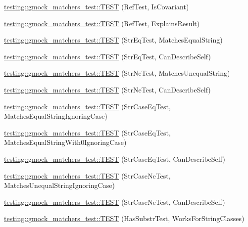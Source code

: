 \begin{DoxyCompactItemize}
\hyperlink{namespacetesting_1_1gmock__matchers__test_a03b45cf0f65f33208ac378b8603ff67a}{testing\+::gmock\+\_\+matchers\+\_\+test\+::\+T\+E\+ST} (Ref\+Test, Is\+Covariant)
\item 
\hyperlink{namespacetesting_1_1gmock__matchers__test_ab73595bcf8dd511b519b640248136ccd}{testing\+::gmock\+\_\+matchers\+\_\+test\+::\+T\+E\+ST} (Ref\+Test, Explains\+Result)
\item 
\hyperlink{namespacetesting_1_1gmock__matchers__test_a5956b46686ad29d2d29b313bce9eba8a}{testing\+::gmock\+\_\+matchers\+\_\+test\+::\+T\+E\+ST} (Str\+Eq\+Test, Matches\+Equal\+String)
\item 
\hyperlink{namespacetesting_1_1gmock__matchers__test_a1cb9d74bdf937816807e91b842b22c75}{testing\+::gmock\+\_\+matchers\+\_\+test\+::\+T\+E\+ST} (Str\+Eq\+Test, Can\+Describe\+Self)
\item 
\hyperlink{namespacetesting_1_1gmock__matchers__test_a3c0a0ca54e3d34c55bd30c2b5572d902}{testing\+::gmock\+\_\+matchers\+\_\+test\+::\+T\+E\+ST} (Str\+Ne\+Test, Matches\+Unequal\+String)
\item 
\hyperlink{namespacetesting_1_1gmock__matchers__test_a4daef0c28c6b07cb3d6a6306c05599b0}{testing\+::gmock\+\_\+matchers\+\_\+test\+::\+T\+E\+ST} (Str\+Ne\+Test, Can\+Describe\+Self)
\item 
\hyperlink{namespacetesting_1_1gmock__matchers__test_ae0c0b82b3895923747dc70cb9339a8dc}{testing\+::gmock\+\_\+matchers\+\_\+test\+::\+T\+E\+ST} (Str\+Case\+Eq\+Test, Matches\+Equal\+String\+Ignoring\+Case)
\item 
\hyperlink{namespacetesting_1_1gmock__matchers__test_aa159c9a52c6dc18cb7f214fbb5bddece}{testing\+::gmock\+\_\+matchers\+\_\+test\+::\+T\+E\+ST} (Str\+Case\+Eq\+Test, Matches\+Equal\+String\+With0\+Ignoring\+Case)
\item 
\hyperlink{namespacetesting_1_1gmock__matchers__test_ab4fb6542ea3a7789850668a9266a80ef}{testing\+::gmock\+\_\+matchers\+\_\+test\+::\+T\+E\+ST} (Str\+Case\+Eq\+Test, Can\+Describe\+Self)
\item 
\hyperlink{namespacetesting_1_1gmock__matchers__test_a9a627f8538cfff62fbaee86ac465f6c8}{testing\+::gmock\+\_\+matchers\+\_\+test\+::\+T\+E\+ST} (Str\+Case\+Ne\+Test, Matches\+Unequal\+String\+Ignoring\+Case)
\item 
\hyperlink{namespacetesting_1_1gmock__matchers__test_ae953891c7961b6ffd51dc712be8d24de}{testing\+::gmock\+\_\+matchers\+\_\+test\+::\+T\+E\+ST} (Str\+Case\+Ne\+Test, Can\+Describe\+Self)
\item 
\hyperlink{namespacetesting_1_1gmock__matchers__test_a2a1043a0b8bfb4bc0b5fb539317132a3}{testing\+::gmock\+\_\+matchers\+\_\+test\+::\+T\+E\+ST} (Has\+Substr\+Test, Works\+For\+String\+Classes)

\end{DoxyCompactItemize}
